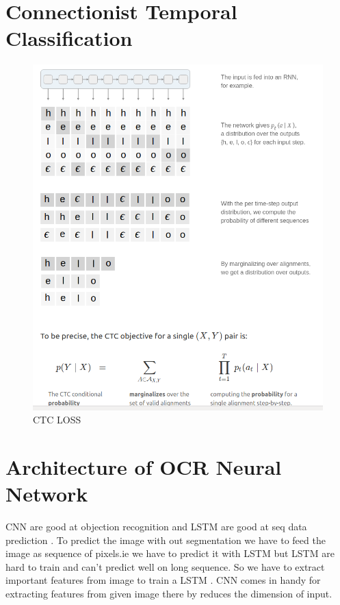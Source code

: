 \section{Connectionist Temporal Classification}
\begin{figure}[h]
\centering
\includegraphics[width=15cm]{Figures/ctc.png}
\caption{ CTC LOSS}
\label{fig:CTC}
\end{figure}


\section{Architecture of OCR Neural Network}

CNN are good at objection recognition and LSTM are good at seq data prediction . To predict the image with
out segmentation we have to feed the image as sequence of pixels.ie we have to predict it with LSTM but LSTM
are hard to train and can't predict well on long sequence. So we have to extract important features from 
image to train a LSTM . CNN comes in handy for extracting  features from given image there by reduces the 
dimension of input. 



